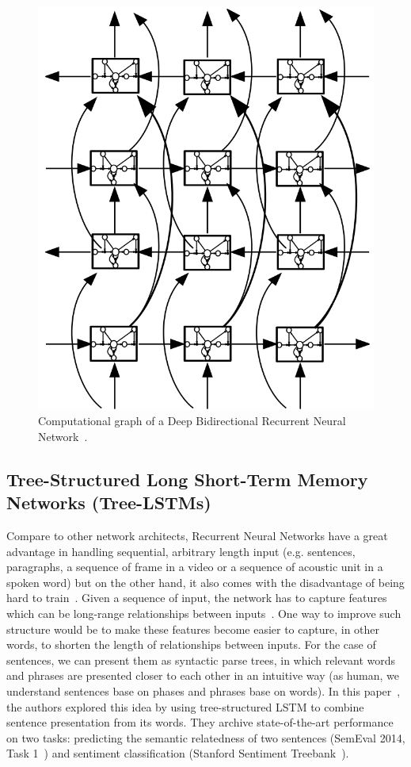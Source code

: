 \begin{figure}[H]
    \centering
    \includegraphics[scale=0.4]{figure/dblstm}
    \caption[Deep Bidirectional Recurrent Neural Network]{Computational graph of a Deep Bidirectional Recurrent Neural Network~\cite{GravesLSTM}.}
    \label{fig:dblstm}
\end{figure}

\subsection{Tree-Structured Long Short-Term Memory Networks (Tree-LSTMs)}\label{sec:treelstm}
Compare to other network architects, Recurrent Neural Networks have a great advantage in handling sequential, arbitrary length input (e.g. sentences, paragraphs, a sequence of frame in a video or a sequence of acoustic unit in a spoken word) but on the other hand, it also comes with the disadvantage of being hard to train~\cite{hardRNN}.
Given a sequence of input, the network has to capture features which can be long-range relationships between inputs~\cite{socher2013recursive}.
One way to improve such structure would be to make these features become easier to capture, in other words, to shorten the length of relationships between inputs.
For the case of sentences, we can present them as syntactic parse trees, in which relevant words and phrases are presented closer to each other in an intuitive way (as human, we understand sentences base on phases and phrases base on words).
In this paper~\cite{treeLSTM}, the authors explored this idea by using tree-structured LSTM to combine sentence presentation from its words.
They archive state-of-the-art performance on two tasks: predicting the semantic relatedness of two sentences (SemEval 2014, Task 1~\cite{SemeEvalTask1}) and sentiment classification (Stanford Sentiment Treebank~\cite{socher2013recursive}).


